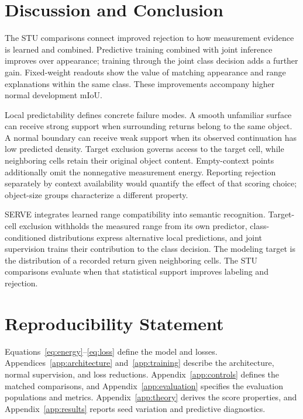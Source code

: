 \documentclass{article}
\begin{document}
\section{Discussion and Conclusion}
The STU comparisons connect improved rejection to how measurement evidence is learned and combined. Predictive training combined with joint inference improves over appearance; training through the joint class decision adds a further gain. Fixed-weight readouts show the value of matching appearance and range explanations within the same class. These improvements accompany higher normal development mIoU.

Local predictability defines concrete failure modes. A smooth unfamiliar surface can receive strong support when surrounding returns belong to the same object. A normal boundary can receive weak support when its observed continuation has low predicted density. Target exclusion governs access to the target cell, while neighboring cells retain their original object content. Empty-context points additionally omit the nonnegative measurement energy. Reporting rejection separately by context availability would quantify the effect of that scoring choice; object-size groups characterize a different property.

SERVE integrates learned range compatibility into semantic recognition. Target-cell exclusion withholds the measured range from its own predictor, class-conditioned distributions express alternative local predictions, and joint supervision trains their contribution to the class decision. The modeling target is the distribution of a recorded return given neighboring cells. The STU comparisons evaluate when that statistical support improves labeling and rejection.

\FloatBarrier
\section*{Reproducibility Statement}
Equations~\eqref{eq:energy}--\eqref{eq:loss} define the model and losses. Appendices~\ref{app:architecture} and~\ref{app:training} describe the architecture, normal supervision, and loss reductions. Appendix~\ref{app:controls} defines the matched comparisons, and Appendix~\ref{app:evaluation} specifies the evaluation populations and metrics. Appendix~\ref{app:theory} derives the score properties, and Appendix~\ref{app:results} reports seed variation and predictive diagnostics.



\end{document}
